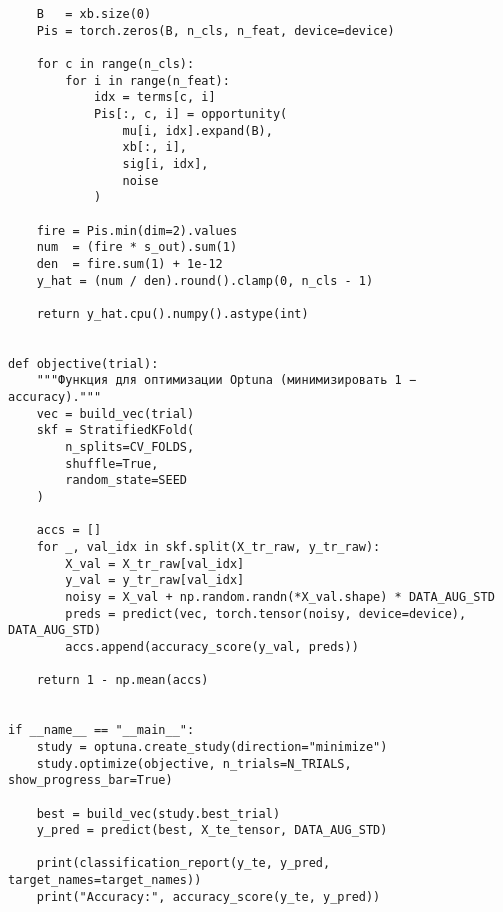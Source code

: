 \begin{verbatim}
    B   = xb.size(0)
    Pis = torch.zeros(B, n_cls, n_feat, device=device)

    for c in range(n_cls):
        for i in range(n_feat):
            idx = terms[c, i]
            Pis[:, c, i] = opportunity(
                mu[i, idx].expand(B),
                xb[:, i],
                sig[i, idx],
                noise
            )

    fire = Pis.min(dim=2).values
    num  = (fire * s_out).sum(1)
    den  = fire.sum(1) + 1e-12
    y_hat = (num / den).round().clamp(0, n_cls - 1)

    return y_hat.cpu().numpy().astype(int)


def objective(trial):
    """Функция для оптимизации Optuna (минимизировать 1 − accuracy)."""
    vec = build_vec(trial)
    skf = StratifiedKFold(
        n_splits=CV_FOLDS,
        shuffle=True,
        random_state=SEED
    )

    accs = []
    for _, val_idx in skf.split(X_tr_raw, y_tr_raw):
        X_val = X_tr_raw[val_idx]
        y_val = y_tr_raw[val_idx]
        noisy = X_val + np.random.randn(*X_val.shape) * DATA_AUG_STD
        preds = predict(vec, torch.tensor(noisy, device=device), DATA_AUG_STD)
        accs.append(accuracy_score(y_val, preds))

    return 1 - np.mean(accs)


if __name__ == "__main__":
    study = optuna.create_study(direction="minimize")
    study.optimize(objective, n_trials=N_TRIALS, show_progress_bar=True)

    best = build_vec(study.best_trial)
    y_pred = predict(best, X_te_tensor, DATA_AUG_STD)

    print(classification_report(y_te, y_pred, target_names=target_names))
    print("Accuracy:", accuracy_score(y_te, y_pred))
\end{verbatim}

